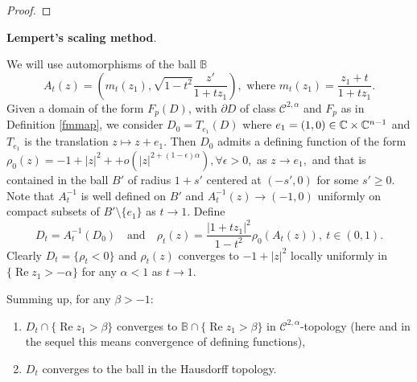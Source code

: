 \documentclass[a4paper,12pt]{amsart}
\def\C{\Bbb C}
\def\re{\operatorname{Re}}
\theoremstyle{remark}\newtheorem{remark}[theorem]{Remark}
\begin{document}
\begin{proof}

\end{proof}

{\bf Lempert's scaling method}. 

We will use automorphisms of the ball $\mathbb B$
\begin{equation}\label{eq:aut}A_t(z) = \left(m_t(z_1), \sqrt{1-t^2} \frac{z'}{1 + tz_1}\right),\text{ where } m_t(z_1)=\frac{z_1+ t}{1+ tz_1}.
\end{equation} 
Given a domain of the form $F_p(D)$, with 
$\partial D$ of class $\mathcal C^{2,\alpha}$ and $F_p$ as in
Definition \ref{fmmap}, we consider $D_0=T_{e_1}(D)$
where $e_1=(1,0)\in \C \times \C^{n-1}$ and $T_{e_1}$ is 
the translation $z\mapsto z+e_1$.
Then $D_0$ admits a defining function  of the form  $\rho_0(z) = -1 +|z|^2 +  + o(|z|^{2+(1-\epsilon)\alpha}),
\forall \epsilon >0,$ as $z\to e_1,$
and that is contained in the ball $B'$ of radius $1+s'$ centered at $(-s',0)$ for some $s'\geq 0$. Note that $A_t^{-1}$ is well defined on $B'$ and $A_t^{-1}(z)\to (-1,0)$ uniformly on compact subsets of $B'\setminus \{e_1\}$ as $t\to 1$. Define 
\begin{equation}\label{eq:Dt} D_t=A_t^{-1}(D_0)\quad \text{and} \quad \rho_t(z) = \frac{|1 + t z_1|^2}{1- t^2} \rho_0(A_t(z)),\ t\in (0,1).
\end{equation}
Clearly $D_t=\{\rho_t<0\}$ and $\rho_t(z)$ converges to $-1 +|z|^2$ locally uniformly in $\{\re z_1>-\alpha\}$ for any $\alpha<1$ as $t\to 1$. 

Summing up, for any $\beta>-1$:
\begin{enumerate}
\item[A1)] $D_t\cap \{\re z_1>\beta\}$ converges to $\mathbb B \cap \{\re z_1>\beta\}$ in $\mathcal C^{2,\alpha}$-topology (here and in the sequel this means convergence of defining functions),
\item[A2)] $D_t$ converges to the ball in the Hausdorff topology.
\end{enumerate}

\end{document}
